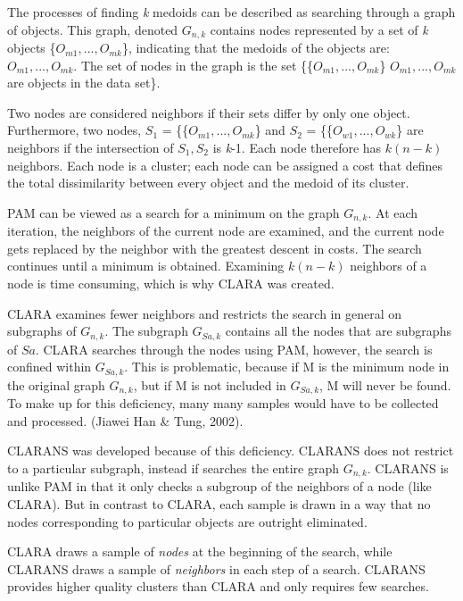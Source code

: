\documentclass[12pt,twoside]{amherstthesis}
\begin{document}
  The processes of finding \emph{k} medoids can be described as searching
  through a graph of objects. This graph, denoted \(G_{n,k}\) contains
  nodes represented by a set of \emph{k} objects
  \{\(O_{m1},... , O_{mk}\)\}, indicating that the medoids of the objects
  are: \(O_{m1},... , O_{mk}\). The set of nodes in the graph is the set
  \{\{\(O_{m1},... , O_{mk}\)\} \textbar{} \(O_{m1},... , O_{mk}\) are
  objects in the data set\}.
  
  Two nodes are considered neighbors if their sets differ by only one
  object. Furthermore, two nodes, \(S_1\) = \{\{\(O_{m1},... , O_{mk}\)\}
  and \(S_2\) = \{\{\(O_{w1},... , O_{wk}\)\} are neighbors if the
  intersection of \(S_1, S_2\) is \emph{k}-1. Each node therefore has
  \(k(n-k)\) neighbors. Each node is a cluster; each node can be assigned
  a cost that defines the total dissimilarity between every object and the
  medoid of its cluster.
  
  PAM can be viewed as a search for a minimum on the graph \(G_{n,k}\). At
  each iteration, the neighbors of the current node are examined, and the
  current node gets replaced by the neighbor with the greatest descent in
  costs. The search continues until a minimum is obtained. Examining
  \(k(n-k)\) neighbors of a node is time consuming, which is why CLARA was
  created.
  
  CLARA examines fewer neighbors and restricts the search in general on
  subgraphs of \(G_{n,k}\). The subgraph \(G_{Sa,k}\) contains all the
  nodes that are subgraphs of \(Sa\). CLARA searches through the nodes
  using PAM, however, the search is confined within \(G_{Sa,k}\). This is
  problematic, because if M is the minimum node in the original graph
  \(G_{n,k}\), but if M is not included in \(G_{Sa,k}\), M will never be
  found. To make up for this deficiency, many many samples would have to
  be collected and processed. (Jiawei Han \& Tung, 2002).
  
  CLARANS was developed because of this deficiency. CLARANS does not
  restrict to a particular subgraph, instead if searches the entire graph
  \(G_{n,k}\). CLARANS is unlike PAM in that it only checks a subgroup of
  the neighbors of a node (like CLARA). But in contrast to CLARA, each
  sample is drawn in a way that no nodes corresponding to particular
  objects are outright eliminated.
  
  CLARA draws a sample of \emph{nodes} at the beginning of the search,
  while CLARANS draws a sample of \emph{neighbors} in each step of a
  search. CLARANS provides higher quality clusters than CLARA and only
  requires few searches.
  
\end{document}
